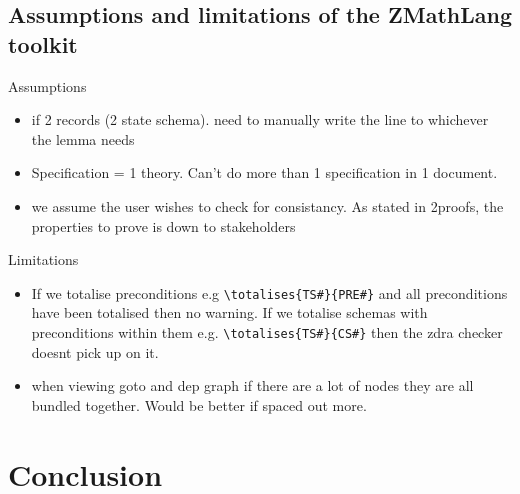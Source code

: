\subsection{Assumptions and limitations of the ZMathLang toolkit}
Assumptions

\begin{itemize}
\item if 2 records (2 state schema). need to manually write the line to whichever the lemma needs

\item Specification = 1 theory. Can't do more than 1 specification in 1 document.

\item we assume the user wishes to check for consistancy. As stated in 2proofs, the properties to prove is down to stakeholders
\end{itemize}

Limitations

\begin{itemize}
\item If we totalise preconditions e.g \verb|\totalises{TS#}{PRE#}| and all preconditions have been totalised then no warning. If we totalise schemas with preconditions within them e.g. \verb|\totalises{TS#}{CS#}| then the \gls{zdra} checker doesnt pick up on it.

\item when viewing goto and dep graph if there are a lot of nodes they are all bundled together. Would be better if spaced out more.
\end{itemize}

\section{Conclusion}

